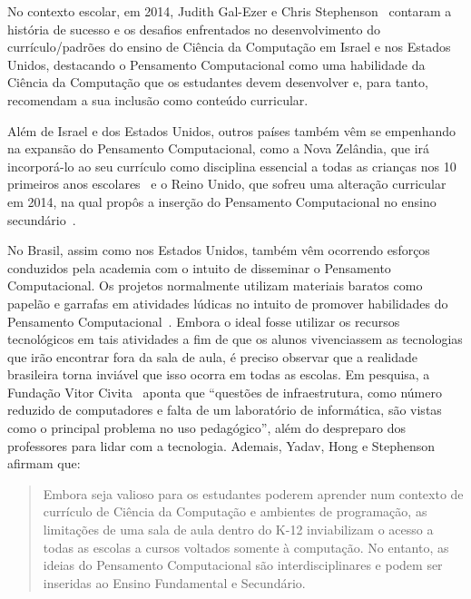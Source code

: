 No contexto escolar, em 2014, Judith Gal-Ezer e Chris Stephenson~\cite{gal-ezer_tale_2014} contaram a história de sucesso e os desafios enfrentados no desenvolvimento do currículo/padrões do ensino de Ciência da Computação em Israel e nos Estados Unidos, destacando o Pensamento Computacional como uma habilidade da Ciência da Computação que os estudantes devem desenvolver e, para tanto, recomendam a sua inclusão como conteúdo curricular. 

Além de Israel e dos Estados Unidos, outros países também vêm se empenhando na expansão do Pensamento Computacional, como a Nova Zelândia, que irá incorporá-lo ao seu currículo como disciplina essencial a todas as crianças nos 10 primeiros anos escolares~\cite{parsons_2016} e o Reino Unido, que sofreu uma alteração curricular em 2014, na qual propôs a inserção do Pensamento Computacional no ensino secundário~\cite{cas_2014}.  

No Brasil, assim como nos Estados Unidos, também vêm ocorrendo esforços conduzidos pela academia com o intuito de disseminar o Pensamento Computacional. Os projetos normalmente utilizam materiais baratos como papelão e garrafas em atividades lúdicas no intuito de promover habilidades do Pensamento Computacional~\cite{pinho_proposta_2016}. Embora o ideal fosse utilizar os recursos tecnológicos em tais atividades a fim de que os alunos vivenciassem as tecnologias que irão encontrar fora da sala de aula, é preciso observar que a realidade brasileira torna inviável que isso ocorra em todas as escolas. Em pesquisa, a Fundação Vitor Civita~\cite{fundacao_victor_civita_o_2009} aponta que “questões de infraestrutura, como número reduzido de computadores e falta de um laboratório de informática, são vistas como o principal problema no uso pedagógico”, além do despreparo dos professores para lidar com a tecnologia. Ademais, Yadav, Hong e Stephenson~\cite{yadav_computational_2016} afirmam que: 

\begin{quote}
Embora seja valioso para os estudantes poderem aprender num contexto de currículo de Ciência da Computação e ambientes de programação, as limitações de uma sala de aula dentro do K-12 inviabilizam o acesso a todas as escolas a cursos voltados somente à computação. No entanto, as ideias do Pensamento Computacional são interdisciplinares e podem ser inseridas ao Ensino Fundamental e Secundário.~\cite[~p.566, tradução das autoras]{yadav_computational_2016}
\end{quote}

